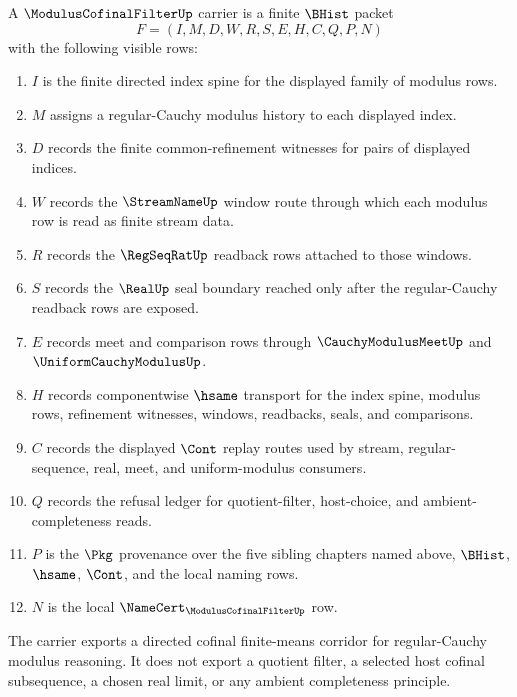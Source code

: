 \begin{definition}
\label{def:modulus-cofinal-filter-carrier}
A $\ModulusCofinalFilterUp$ carrier is a finite $\BHist$ packet
$$
F=(I,M,D,W,R,S,E,H,C,Q,P,N)
$$
with the following visible rows:
\begin{enumerate}
\item $I$ is the finite directed index spine for the displayed family of modulus rows.
\item $M$ assigns a regular-Cauchy modulus history to each displayed index.
\item $D$ records the finite common-refinement witnesses for pairs of displayed indices.
\item $W$ records the $\StreamNameUp$ window route through which each modulus row is read as finite stream data.
\item $R$ records the $\RegSeqRatUp$ readback rows attached to those windows.
\item $S$ records the $\RealUp$ seal boundary reached only after the regular-Cauchy readback rows are exposed.
\item $E$ records meet and comparison rows through $\CauchyModulusMeetUp$ and $\UniformCauchyModulusUp$.
\item $H$ records componentwise $\hsame$ transport for the index spine, modulus rows, refinement witnesses, windows, readbacks, seals, and comparisons.
\item $C$ records the displayed $\Cont$ replay routes used by stream, regular-sequence, real, meet, and uniform-modulus consumers.
\item $Q$ records the refusal ledger for quotient-filter, host-choice, and ambient-completeness reads.
\item $P$ is the $\Pkg$ provenance over the five sibling chapters named above, $\BHist$, $\hsame$, $\Cont$, and the local naming rows.
\item $N$ is the local $\NameCert_{\ModulusCofinalFilterUp}$ row.
\end{enumerate}
The carrier exports a directed cofinal finite-means corridor for regular-Cauchy modulus reasoning. It does not export a quotient filter, a selected host cofinal subsequence, a chosen real limit, or any ambient completeness principle.
\end{definition}

